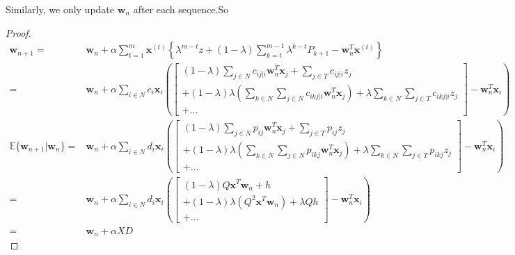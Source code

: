 Similarly, we only update $\mathbf{w}_n$ after each sequence.So
\begin{proof}
\begin{equation}
    \begin{aligned}
        \label{eq:6}
        \mathbf{w}_{n+1}
        =&\mathbf{w}_{n} + \alpha \sum^{m}_{t=1} \mathbf{x}^{(t)}
            \left\{ \lambda ^{m-t} z + (1-\lambda)\sum^{m-1}_{k=t}\lambda^{k-t}P_{k+1}-  \mathbf{w}_n^T
            \mathbf{x}^{(t)}  \right\} \\ 
        =&\mathbf{w}_{n} + \alpha \sum^{}_{i \in N} c_i \textbf{x} _{i} 
        \left( 
        \begin{bmatrix}
            (1-\lambda)\sum^{}_{j\in N} c _{ij|i} \textbf{w}^T_n \textbf{x}_j + \sum^{}_{j\in T}  c _{ij|i} z_j \\
            +(1-\lambda)\lambda( \sum^{}_{k\in N} \sum^{}_{j \in N} c _{ikj|i} \textbf{w}^T_n \textbf{x}_j )
            + \lambda \sum^{}_{k \in N} \sum^{}_{j \in T} c _{ikj|i} z_j \\
            +\ldots
        \end{bmatrix} 
          - \textbf{w}^T_n \textbf{x}_i 
        \right) \\
        \mathbb{E} \{ \textbf{w} _{n+1} | \textbf{w} _{n} \}
        =&\mathbf{w}_{n} + \alpha \sum^{}_{i \in N} d_i \textbf{x} _{i} 
        \left( 
        \begin{bmatrix}
            (1-\lambda)\sum^{}_{j\in N} p _{ij} \textbf{w}^T_n \textbf{x}_j + \sum^{}_{j\in T}  p _{ij} z_j \\
            +(1-\lambda)\lambda( \sum^{}_{k\in N} \sum^{}_{j \in N} p _{ikj} \textbf{w}^T_n \textbf{x}_j )
            + \lambda \sum^{}_{k \in N} \sum^{}_{j \in T} p _{ikj} z_j \\
            +\ldots
        \end{bmatrix} 
          - \textbf{w}^T_n \textbf{x}_i 
        \right) \\
        =&\mathbf{w}_{n} + \alpha \sum^{}_{i \in N} d_i \textbf{x} _{i} 
        \left( 
        \begin{bmatrix}
            (1-\lambda) Q \textbf{x}^T \textbf{w}_n + h \\
            + (1-\lambda) \lambda (Q ^{2} \textbf{x}^T \textbf{w}_n) + \lambda Qh  \\
            + \ldots
        \end{bmatrix} 
          - \textbf{w}^T_n \textbf{x}_i 
        \right) \\
        =& \textbf{w} _{n} + \alpha X D

\end{aligned}
\end{equation}
\end{proof}
